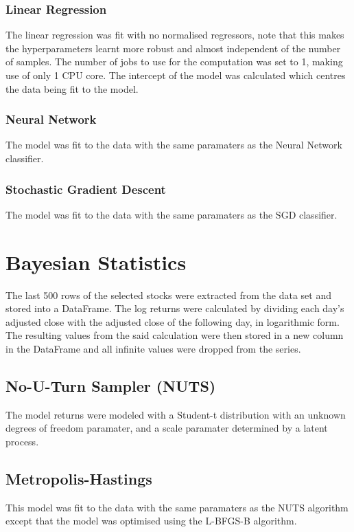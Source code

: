 \subsubsection{Linear Regression}
The linear regression was fit with no normalised regressors, note that this makes the hyperparameters learnt more robust and almost independent of the number of samples. The number of jobs to use for the computation was set to 1, making use of only 1 CPU core. The intercept of the model was calculated which centres the data being fit to the model.

\subsubsection{Neural Network}
The model was fit to the data with the same paramaters as the Neural Network classifier.

\subsubsection{Stochastic Gradient Descent}
The model was fit to the data with the same paramaters as the SGD classifier.

\section{Bayesian Statistics}
The last 500 rows of the selected stocks were extracted from the data set and stored into a DataFrame. The log returns were calculated by dividing each day's adjusted close with the adjusted close of the following day, in logarithmic form. The resulting values from the said calculation were then stored in a new column in the DataFrame and all infinite values were dropped from the series.

\subsection{No-U-Turn Sampler (NUTS)}
The model returns were modeled with a Student-t distribution with an unknown degrees of freedom paramater, and a scale paramater determined by a latent process. 

\subsection{Metropolis-Hastings}
This model was fit to the data with the same paramaters as the NUTS algorithm except that the model was optimised using the L-BFGS-B algorithm.

